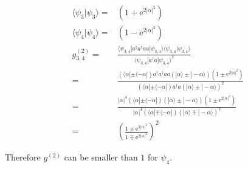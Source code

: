 \documentclass[10pt,fleqn]{article}
\newcommand{\ue}{\mathrm{e}}
\newcommand{\eqar}[1]
{
  \begin{align*}
    #1
  \end{align*}
}
\newcommand{\paren}[1]{{\left({#1}\right)}}
\newcommand{\abs}[1]{{\left|{#1}\right|}}
\begin{document}
\subsection{}
\eqar{
  \langle\psi_3|\psi_3\rangle=&\paren{1+\ue^{2\abs{\alpha}^2}}\\
  \langle\psi_4|\psi_4\rangle=&\paren{1-\ue^{2\abs{\alpha}^2}}\\
  g^{(2)}_{3,4}=&\frac{\langle\psi_{3,4}|a^\dagger a^\dagger a a|\psi_{3,4}\rangle\langle\psi_{3,4}|\psi_{3,4}\rangle}{\langle\psi_{3,4}|a^\dagger a|\psi_{3,4}\rangle^2}\\
  =&\frac{\paren{\langle\alpha|\pm\langle-\alpha|}a^\dagger a^\dagger a a\paren{|\alpha\rangle\pm|-\alpha\rangle}\paren{1\pm\ue^{2\abs{\alpha}^2}}}{\paren{\langle\alpha|\pm\langle-\alpha|}a^\dagger a\paren{|\alpha\rangle\pm|-\alpha\rangle}^2}\\
  =&\frac{\abs{\alpha}^4\paren{\langle\alpha|\pm\langle-\alpha|}\paren{|\alpha\rangle\pm|-\alpha\rangle}\paren{1\pm\ue^{2\abs{\alpha}^2}}}{\abs{\alpha}^4\paren{\langle\alpha|\mp\langle-\alpha|}\paren{|\alpha\rangle\mp|-\alpha\rangle}^2}\\
  =&\paren{\frac{1\pm\ue^{2\abs{\alpha}^2}}{1\mp\ue^{2\abs{\alpha}^2}}}^2
}
Therefore $g^{(2)}$ can be smaller than $1$ for $\psi_4$.

\section{}
\end{document}
